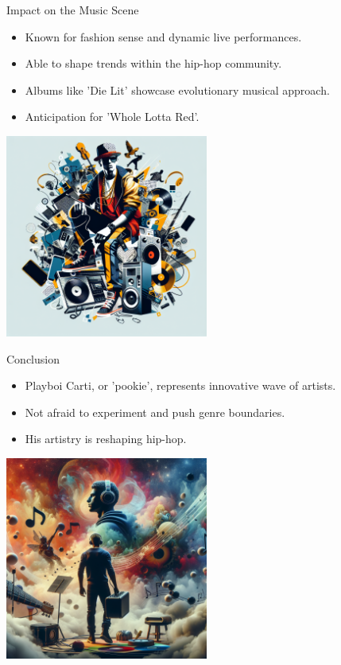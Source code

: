 \documentclass{beamer}
\begin{document}
\begin{frame}{Impact on the Music Scene}
    \begin{itemize}
        \item Known for fashion sense and dynamic live performances.
        \item Able to shape trends within the hip-hop community.
        \item Albums like 'Die Lit' showcase evolutionary musical approach.
        \item Anticipation for 'Whole Lotta Red'.
    \end{itemize}
    \begin{center}
        \includegraphics[width=0.5\textwidth]{./images/MusicImpact.png}
    \end{center}
\end{frame}

\begin{frame}{Conclusion}
    \begin{itemize}
        \item Playboi Carti, or 'pookie', represents innovative wave of artists.
        \item Not afraid to experiment and push genre boundaries.
        \item His artistry is reshaping hip-hop.
    \end{itemize}
    \begin{center}
        \includegraphics[width=0.5\textwidth]{./images/Conclusion.png}
    \end{center}
\end{frame}
\end{document}
